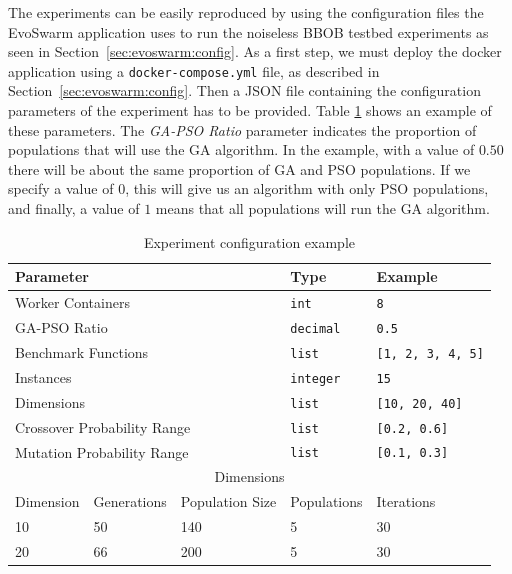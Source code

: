 \documentclass[review]{elsarticle}
\begin{document}
The experiments can be easily reproduced by using the configuration
files the EvoSwarm application uses to run the noiseless BBOB testbed
experiments as seen in Section~\ref{sec:evoswarm:config}. 
As a first step, we must deploy the docker application using a
{\tt docker-compose.yml} file, as described in Section~\ref{sec:evoswarm:config}. 
Then a JSON file containing the configuration parameters of the
experiment has to be provided.  Table \ref{tab:params} shows an example of these
parameters. The {\em GA-PSO Ratio} parameter indicates the proportion of
populations that will use the GA algorithm.  In the example, with a value of
$0.50$ there will be about the same proportion of GA and PSO populations. If we
specify a value of $0$, this will give us an algorithm with only PSO
populations, and finally, a value of  $1$ means that all populations will run
the GA algorithm. 

\begin{table}[h!tbp]
  \small
  \caption{ Experiment configuration example 
  }
  \label{tab:params}
  \centering
  \small
  \begin{tabular}{|l|l|l|l|l|}
    \hline
    \multicolumn{3}{|l|}{Parameter}                    & Type             & Example         \\ \hline
    \multicolumn{3}{|l|}{Worker Containers}        & \texttt{int}     & \texttt{8} \\ \hline
    \multicolumn{3}{|l|}{GA-PSO Ratio}                 & \texttt{decimal} & \texttt{0.5}    \\  \hline
    \multicolumn{3}{|l|}{Benchmark Functions}          & \texttt{list}    & \texttt{[1, 2, 3, 4, 5]} \\ \hline
    \multicolumn{3}{|l|}{Instances}                    & \texttt{integer}    & \texttt{15} \\ \hline
    \multicolumn{3}{|l|}{Dimensions}                   & \texttt{list}    & \texttt{[10, 20, 40]}        \\ \hline
    \multicolumn{3}{|l|}{Crossover Probability Range}  & \texttt{list}    & \texttt{[0.2, 0.6]}      \\ \hline
    \multicolumn{3}{|l|}{Mutation  Probability Range}  & \texttt{list}    & \texttt{[0.1, 0.3]}      \\ \hline
    \multicolumn{5}{|c|}{Dimensions}                                                      \\ \hline  
    Dimension               & Generations & Population Size & Populations  &     Iterations    \\ \hline
            10              & 50      & 140                 &      5                 & 30                \\ \hline
            20              & 66      & 200                 &      5                 & 30               \\ \hline
  \end{tabular}
\end{table}
\end{document}
